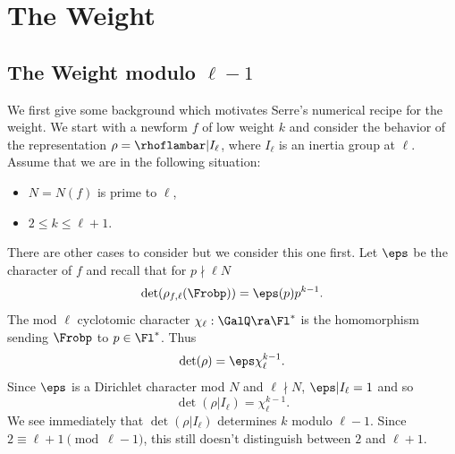 \documentclass{report}
\begin{document}
\section{The Weight}
\subsection{The Weight modulo $\ell-1$}
We first give some background which motivates
Serre's numerical recipe for the weight.
We start with a newform $f$ of low weight $k$ and consider the
behavior of the representation $\rho=\rhoflambar|I_{\ell}$, where
$I_{\ell}$ is an inertia group at $\ell$.  Assume that we
are in the following situation:
\begin{itemize}
\item $N=N(f)$ is prime to $\ell$,
\item $2\leq k\leq \ell+1$.
\end{itemize}
There are other cases to consider but we consider this one first.
Let $\eps$ be the character of $f$ and recall that for $p\nmid \ell N$
$$\det(\rho_{f,\ell}(\Frobp)) = \eps(p)p^{k-1}.$$
The mod $\ell$ cyclotomic character $\chi_{\ell}:\GalQ\ra\Fl^*$ is the
homomorphism sending $\Frobp$ to $p\in\Fl^*$. Thus
$$\det(\rho) = \eps\chi_{\ell}^{k-1}.$$
Since $\eps$ is a Dirichlet character mod $N$ and $\ell\nmid N$,
$\eps|I_{\ell}=1$ and so
   $$\det(\rho|I_{\ell})=\chi_{\ell}^{k-1}.$$
We see immediately that $\det(\rho|I_{\ell})$ determines $k$ modulo $\ell-1$.
Since $2\equiv\ell+1\pmod{\ell-1}$, this still doesn't distinguish
between $2$ and $\ell+1$.
\end{document}
